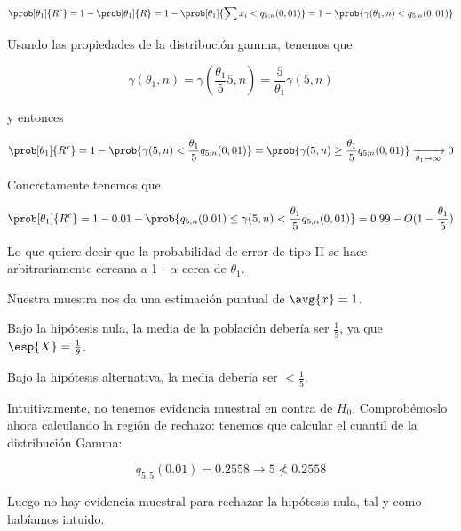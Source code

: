 \begin{problem}[1]
\[
\prob[\theta_1]{R^c} =
1 - \prob[\theta_1]{R} =
1 - \prob[\theta_1]{\sum x_i < q_{5; n}(0,01)} =
1 - \prob{\gamma(\theta_1, n) < q_{5; n}(0,01)}
\]

Usando las propiedades de la distribución gamma, tenemos que

\[
\gamma(\theta_1, n) =
\gamma\left(\frac{\theta_1}{5}5, n\right) =
\frac{5}{\theta_1}\gamma(5, n)
\]

y entonces

\[
\prob[\theta_1]{R^c} =
1 - \prob{\gamma(5, n) < \frac{\theta_1}{5}q_{5; n}(0,01)} =
\prob{\gamma(5, n)\geq \frac{\theta_1}{5}q_{5; n} (0,01)}
\xrightarrow[\theta_1 \to \infty]{} 0
\]

Concretamente tenemos que

\[
\prob[\theta_1]{R^c} =
1 - 0.01 - \prob{q_{5; n}(0.01) \leq \gamma(5, n) < \frac{\theta_1}{5}q_{5; n} (0,01)} =
0.99 - O(1 - \frac{\theta_1}{5})
\]

Lo que quiere decir que la probabilidad de error de tipo II se hace arbitrariamente cercana a 1 - $\alpha$ cerca de $\theta_1$.

\spart Nuestra muestra nos da una estimación puntual de $\avg{x} = 1$.

\noindent Bajo la hipótesis nula, la media de la población debería ser $\frac{1}{5}$, ya que $\esp{X} = \frac{1}{\theta}$.

\noindent Bajo la hipótesis alternativa, la media debería ser $ < \frac{1}{5}$.

Intuitivamente, no tenemos evidencia muestral en contra de $H_0$. Comprobémoslo ahora calculando la región de rechazo:
tenemos que calcular el cuantil de la distribución Gamma:

\[ q_{5, 5}(0.01) = 0.2558 \rightarrow 5 \nless 0.2558 \]

Luego no hay evidencia muestral para rechazar la hipótesis nula, tal y como habíamos intuido.

\end{problem}

